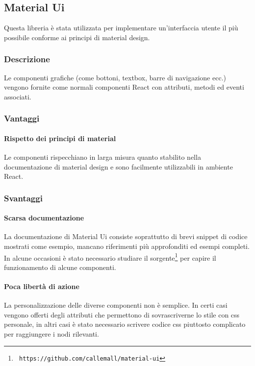 \subsection{Material Ui}\label{material-ui}

Questa libreria è stata utilizzata per implementare un'interfaccia utente il più
possibile conforme ai principi di material design.

\subsubsection{Descrizione}
Le componenti grafiche (come bottoni, textbox, barre di navigazione ecc.) vengono
fornite come normali componenti React con attributi, metodi ed eventi associati.

\subsubsection{Vantaggi}

\paragraph{Rispetto dei principi di material}
Le componenti rispecchiano in larga
misura quanto stabilito nella documentazione di material design e sono facilmente 
utilizzabili in ambiente React.

\subsubsection{Svantaggi}\label{svantaggi-material-ui}

\paragraph{Scarsa documentazione}
La documentazione di Material Ui consiste soprattutto
di brevi snippet di codice mostrati come esempio, mancano riferimenti più approfonditi ed
esempi completi. In alcune occasioni è stato necessario studiare il sorgente\footnote{\texttt{ https://github.com/callemall/material-ui}} per capire il
funzionamento di alcune componenti.

\paragraph{Poca libertà di azione}
La personalizzazione delle diverse componenti non è
semplice. In certi casi vengono offerti degli attributi che permettono di sovrascriverne
lo stile con css personale, in altri casi è stato necessario scrivere codice css piuttosto
complicato per raggiungere i nodi rilevanti.

